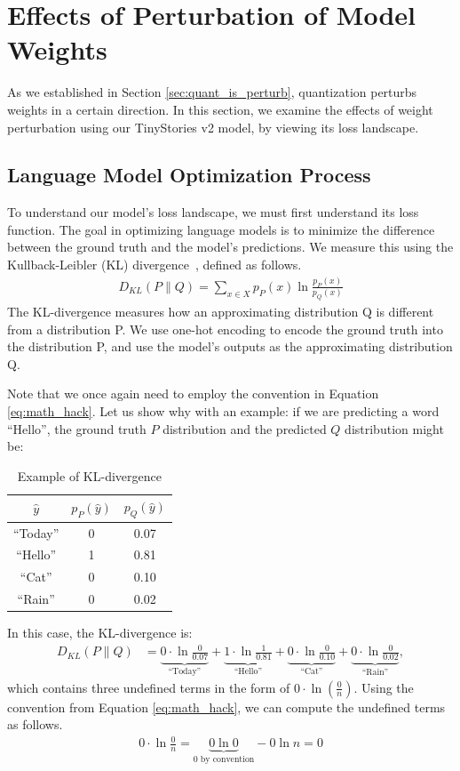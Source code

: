 \documentclass[../main.tex]{subfiles}
\begin{document}
\section{Effects of Perturbation of Model Weights}

As we established in Section \ref{sec:quant_is_perturb}, quantization perturbs weights in a certain direction. In this section, we examine the effects of weight perturbation using our TinyStories v2 model, by viewing its loss landscape.

\subsection{Language Model Optimization Process}
To understand our model's loss landscape, we must first understand its loss function. The goal in optimizing language models is to minimize the difference between the ground truth and the model's predictions. We measure this using the Kullback-Leibler (KL) divergence~\cite{kullbackInformationSufficiency1951a}, defined as follows.
\begin{align}
    D_{KL}(P\parallel Q)= \sum_{x\in X} p_P(x)\ln\frac{p_P(x)}{p_Q(x)}
\end{align}
The KL-divergence measures how an approximating distribution Q is different from a distribution P. We use one-hot encoding to encode the ground truth into the distribution P, and use the model's outputs as the approximating distribution Q. 

Note that we once again need to employ the convention in Equation \ref{eq:math_hack}. Let us show why with an example: if we are predicting a word ``Hello'', the ground truth $P$ distribution and the predicted $Q$ distribution might be:
\begin{table}[H]
\centering
\caption{Example of KL-divergence}
\begin{tabular}{|c|c|c|}
\hline
$\hat{y}$ & $p_P(\hat{y})$ & $p_Q(\hat{y})$ \\ \hline
``Today'' & 0 & 0.07 \\ \hline
``Hello'' & 1 & 0.81\\ \hline
``Cat'' & 0 & 0.10\\ \hline
``Rain'' & 0 & 0.02 \\ \hline
\end{tabular}
\end{table} 

In this case, the KL-divergence is:
\begin{align}
D_{KL}(P \parallel Q)
&= \underbrace{0 \cdot \ln\frac{0}{0.07}}_{\text{``Today''}}
+ \underbrace{1 \cdot \ln\frac{1}{0.81}}_{\text{``Hello''}}
+ \underbrace{0 \cdot \ln\frac{0}{0.10}}_{\text{``Cat''}}
+ \underbrace{0 \cdot \ln\frac{0}{0.02}}_{\text{``Rain''}},
\end{align}
which contains three undefined terms in the form of $0\cdot\ln(\frac{0}{n})$. 
Using the convention from Equation \ref{eq:math_hack}, we can compute the undefined terms as follows.
\begin{align}
0\cdot \ln \frac{0}{n} = \underbrace{0\ln 0}_{0\text{ by convention}} - 0\ln n = 0
\end{align}
\end{document}
